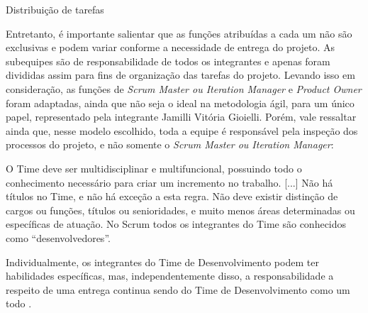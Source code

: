 \begin{quadro}[htb]
\centering
\ABNTEXfontereduzida
\caption{Distribuição de tarefas}
\label{distribuicao_tarefas}
\end{quadro}
\FloatBarrier 

Entretanto, é importante salientar que as funções atribuídas a cada um não são exclusivas e podem variar conforme a necessidade de entrega do projeto. As subequipes são de responsabilidade de todos os integrantes e apenas foram divididas assim para fins de organização das tarefas do projeto. Levando isso em consideração, as funções de \textsl{Scrum Master ou Iteration Manager} e \textsl{Product Owner} foram adaptadas, ainda que não seja o ideal na metodologia ágil, para um único papel, representado pela integrante Jamilli Vitória Gioielli. Porém, vale ressaltar ainda que, nesse modelo escolhido, toda a equipe é responsável pela inspeção dos processos do projeto, e não somente o \textsl{Scrum Master ou Iteration Manager}:

\begin{citacao}
O Time deve ser multidisciplinar e multifuncional, possuindo todo o conhecimento necessário para criar um incremento no trabalho. [...] Não há títulos no Time, e não há exceção a esta regra. Não deve existir distinção de cargos ou funções, títulos ou senioridades, e muito menos áreas determinadas ou específicas de atuação. No Scrum todos os integrantes do Time são conhecidos como “desenvolvedores”.

Individualmente, os integrantes do Time de Desenvolvimento podem ter habilidades específicas, mas, independentemente disso, a responsabilidade a respeito de uma entrega continua sendo do Time de Desenvolvimento como um todo \cite{cruz:2018}.
\end{citacao}

